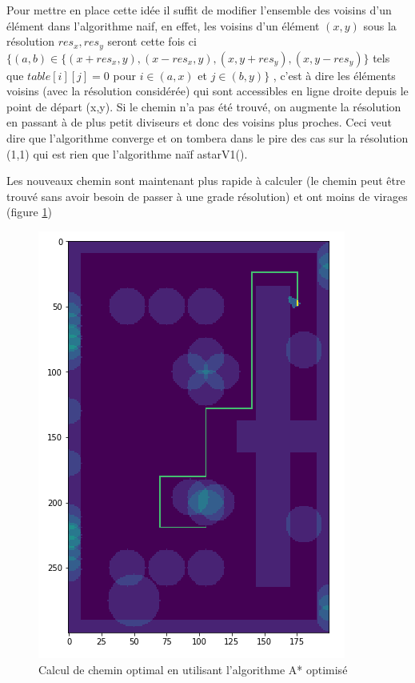 \documentclass{article}
\begin{document}
Pour mettre en place cette idée il suffit de modifier l'ensemble des voisins d'un élément dans l'algorithme naif, en effet, les voisins d'un élément $(x,y)$ sous la résolution $res_{x}, res_{y}$ seront cette fois ci $\{(a,b) \in \{(x+res_{x}, y), (x-res_{x}, y), (x, y + res_{y}), (x, y - res_{y})\}$ tels que $table[i][j] = 0$ pour $i \in (a,x)$ et $j \in (b,y)\}$ , c'est à dire les éléments voisins (avec la résolution considérée) qui sont accessibles en ligne droite depuis le point de départ (x,y). Si le chemin n'a pas été trouvé, on augmente la résolution en passant à de plus petit diviseurs et donc des voisins plus proches. Ceci veut dire que l'algorithme converge et on tombera dans le pire des cas sur la résolution (1,1) qui est rien que l'algorithme naïf astarV1().  

Les nouveaux chemin sont maintenant plus rapide à calculer (le chemin peut être trouvé sans avoir besoin de passer à une grade résolution) et ont moins de virages (figure \ref{fig:astarV2})

\begin{figure}[!h]
\centering
\includegraphics[scale=0.6]{astarV2}
\caption{Calcul de chemin optimal en utilisant l'algorithme A* optimisé}
\label{fig:astarV2}
\end{figure}
\end{document}
